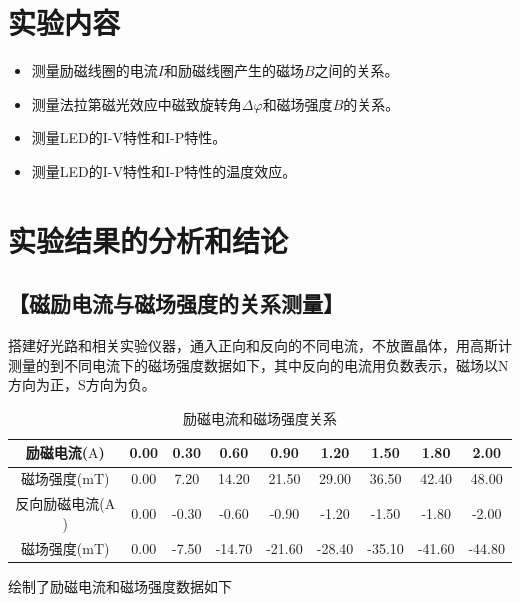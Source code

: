\documentclass{ctexart}
\newcommand{\si}[1]{\mathrm{#1}}
\let\oldsubsection\subsection
\renewcommand{\subsection}[1]{\oldsubsection{\!\!\!\!\!\!【#1】}}
\begin{document}
\section{实验内容}

\begin{itemize}
\item 测量励磁线圈的电流$I$和励磁线圈产生的磁场$B$之间的关系。
\item 测量法拉第磁光效应中磁致旋转角$\Delta \varphi$和磁场强度$B$的关系。
\item 测量LED的I-V特性和I-P特性。
\item 测量LED的I-V特性和I-P特性的温度效应。
\end{itemize}

\newpage
\section{实验结果的分析和结论}

\subsection{磁励电流与磁场强度的关系测量}

搭建好光路和相关实验仪器，通入正向和反向的不同电流，不放置晶体，用高斯计测量的到不同电流下的磁场强度数据如下，其中反向的电流用负数表示，磁场以N方向为正，S方向为负。

\begin{table}[H]
  \centering
  \begin{tabular}{|c|c|c|c|c|c|c|c|c|}
    \hline
    励磁电流($\si{A}$)   & 0.00 & 0.30 & 0.60 & 0.90 & 1.20 & 1.50 & 1.80 & 2.00 \\\hline
    磁场强度($\si{mT}$)  & 0.00 & 7.20 & 14.20 & 21.50 & 29.00 & 36.50 & 42.40 & 48.00 \\\hline
    反向励磁电流($\si{A}$) & 0.00 & -0.30 & -0.60 & -0.90 & -1.20 & -1.50 & -1.80 & -2.00 \\\hline
    磁场强度($\si{mT}$)  & 0.00 & -7.50 & -14.70 & -21.60 & -28.40 & -35.10 & -41.60 & -44.80 \\\hline
  \end{tabular}
  \caption{励磁电流和磁场强度关系}
\end{table}

绘制了励磁电流和磁场强度数据如下
\end{document}
